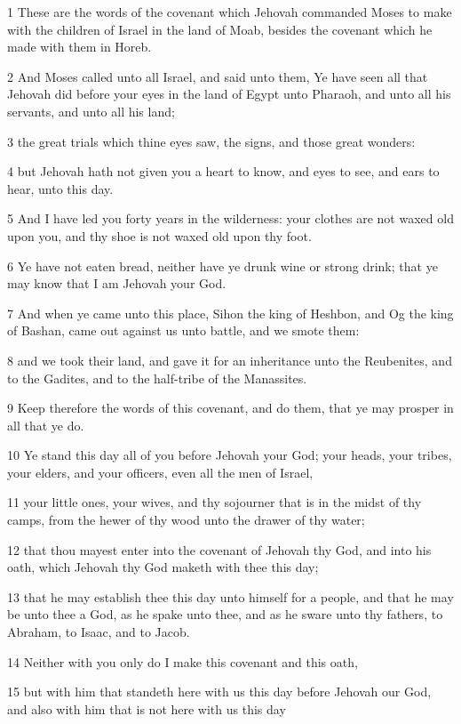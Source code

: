 \par 1 These are the words of the covenant which Jehovah commanded Moses to make with the children of Israel in the land of Moab, besides the covenant which he made with them in Horeb.
\par 2 And Moses called unto all Israel, and said unto them, Ye have seen all that Jehovah did before your eyes in the land of Egypt unto Pharaoh, and unto all his servants, and unto all his land;
\par 3 the great trials which thine eyes saw, the signs, and those great wonders:
\par 4 but Jehovah hath not given you a heart to know, and eyes to see, and ears to hear, unto this day.
\par 5 And I have led you forty years in the wilderness: your clothes are not waxed old upon you, and thy shoe is not waxed old upon thy foot.
\par 6 Ye have not eaten bread, neither have ye drunk wine or strong drink; that ye may know that I am Jehovah your God.
\par 7 And when ye came unto this place, Sihon the king of Heshbon, and Og the king of Bashan, came out against us unto battle, and we smote them:
\par 8 and we took their land, and gave it for an inheritance unto the Reubenites, and to the Gadites, and to the half-tribe of the Manassites.
\par 9 Keep therefore the words of this covenant, and do them, that ye may prosper in all that ye do.
\par 10 Ye stand this day all of you before Jehovah your God; your heads, your tribes, your elders, and your officers, even all the men of Israel,
\par 11 your little ones, your wives, and thy sojourner that is in the midst of thy camps, from the hewer of thy wood unto the drawer of thy water;
\par 12 that thou mayest enter into the covenant of Jehovah thy God, and into his oath, which Jehovah thy God maketh with thee this day;
\par 13 that he may establish thee this day unto himself for a people, and that he may be unto thee a God, as he spake unto thee, and as he sware unto thy fathers, to Abraham, to Isaac, and to Jacob.
\par 14 Neither with you only do I make this covenant and this oath,
\par 15 but with him that standeth here with us this day before Jehovah our God, and also with him that is not here with us this day
